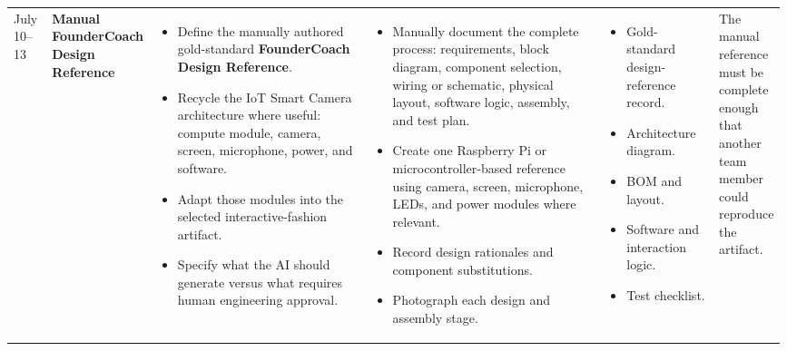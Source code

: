 \documentclass{article}
\begin{document}
\begin{landscape}
\begin{longtable}{
    L{0.05\linewidth}
    L{0.08\linewidth}
    L{0.3\linewidth}
    L{0.33\linewidth}
    L{0.15\linewidth}
    L{0.08\linewidth}
}
July 10--13
&
\textbf{Manual FounderCoach Design Reference}
&
\begin{itemize}[leftmargin=*,nosep]
    \item Define the manually authored gold-standard
    \textbf{FounderCoach Design Reference}.
    \item Recycle the IoT Smart Camera architecture where useful:
    compute module, camera, screen, microphone, power, and software.
    \item Adapt those modules into the selected interactive-fashion
    artifact.
    \item Specify what the AI should generate versus what requires
    human engineering approval.
\end{itemize}
&
\begin{itemize}[leftmargin=*,nosep]
    \item Manually document the complete process:
    requirements, block diagram, component selection, wiring or
    schematic, physical layout, software logic, assembly, and test plan.
    \item Create one Raspberry Pi or microcontroller-based reference
    using camera, screen, microphone, LEDs, and power modules where
    relevant.
    \item Record design rationales and component substitutions.
    \item Photograph each design and assembly stage.
\end{itemize}
&
\begin{itemize}[leftmargin=*,nosep]
    \item Gold-standard design-reference record.
    \item Architecture diagram.
    \item BOM and layout.
    \item Software and interaction logic.
    \item Test checklist.
\end{itemize}
&
The manual reference must be complete enough that another team member
could reproduce the artifact.
\\


\end{longtable}
\end{landscape}
\end{document}

